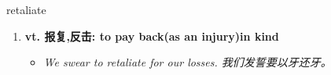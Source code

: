 
\begin{frame}
{\huge retaliate}
\begin{center}
\begin{enumerate}\Large
  \item \textbf{vt. 报复,反击: to pay back(as an injury)in kind}
  \begin{itemize}
    \item \em{\Large{We swear to retaliate for our losses. 我们发誓要以牙还牙。}}
  \end{itemize}
\end{enumerate}
\end{center}
\end{frame}
